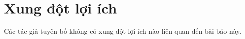 
\section{Xung đột lợi ích}

Các tác giả tuyên bố không có xung đột lợi ích nào liên quan đến bài báo
này.
